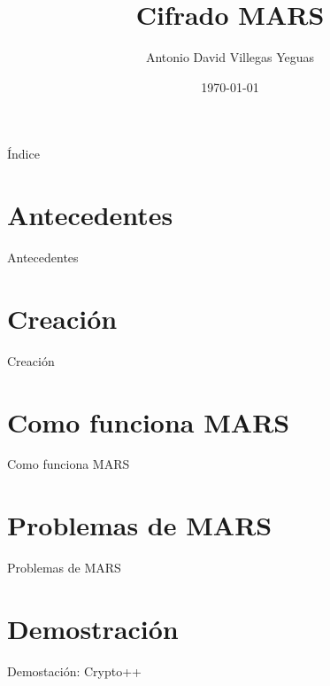 \documentclass{beamer}
\title{Cifrado MARS}
\date{\today}
\author{Antonio David Villegas Yeguas}
\institute{Universidad de Granada\\
\medskip
\textit{advy99@correo.ugr.es}
\doclicenseThis
}
\begin{document}
 \maketitle

\begin{frame}{Índice}
\tableofcontents
\end{frame}




\section{Antecedentes}
\begin{frame}[allowframebreaks]{Antecedentes}


\end{frame}


\section{Creación}
\begin{frame}[allowframebreaks]{Creación}


\end{frame}

\section{Como funciona MARS}
\begin{frame}[allowframebreaks]{Como funciona MARS}



\end{frame}

\section{Problemas de MARS}
\begin{frame}[allowframebreaks]{Problemas de MARS}



\end{frame}


\section{Demostración}
\begin{frame}[allowframebreaks]{Demostación: Crypto++}



\end{frame}
\end{document}
